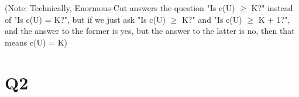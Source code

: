 \documentclass[11pt,a4paper]{article}
\begin{document}
(Note: Technically, Enormous-Cut answers the question "Is c(U) $\geq$ K?" instead of "Is c(U) = K?", but if we just ask "Is c(U) $\geq$ K?" and "Is c(U) $\geq$ K + 1?", and the answer to the former is yes, but the answer to the latter is no, then that means c(U) = K)

\section*{Q2}
\end{document}
